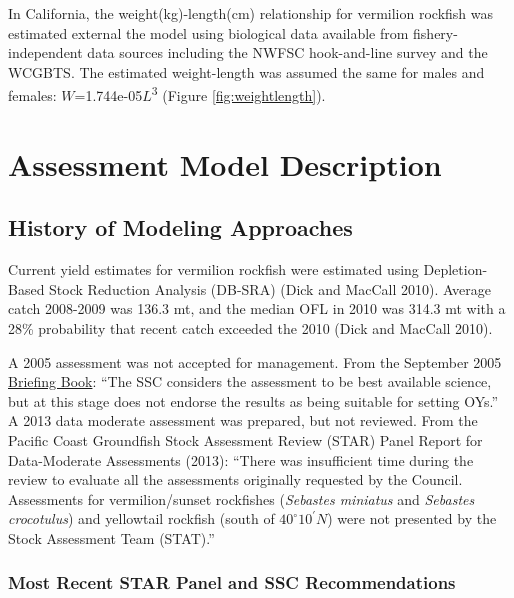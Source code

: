 \documentclass[
  english,
  a4paper,
]{article}
\begin{document}
In California, the weight(kg)-length(cm) relationship for vermilion rockfish was estimated external the
model using biological data available from fishery-independent
data sources including the NWFSC hook-and-line survey and the WCGBTS. The estimated
weight-length was assumed the same for males and females:
\(W\)=1.744e-05\(L\)\textsuperscript{3}
(Figure \ref{fig:weightlength}).

\hypertarget{assessment-model-description}{%
\section{Assessment Model Description}\label{assessment-model-description}}

\hypertarget{history-of-modeling-approaches}{%
\subsection{History of Modeling Approaches}\label{history-of-modeling-approaches}}

Current yield estimates for vermilion rockfish were estimated using
Depletion-Based Stock Reduction Analysis (DB-SRA) (Dick and MacCall 2010). Average catch
2008-2009 was 136.3 mt, and the median OFL in 2010 was 314.3 mt with a 28\%
probability that recent catch exceeded the 2010 (Dick and MacCall 2010).

A 2005 assessment was not accepted for management.
From the September 2005 \href{https://www.pcouncil.org/documents/2005/09/f-groundfish-management-september-2005.pdf/}{Briefing Book}:
``The SSC considers the assessment to be best available science, but at this stage does not
endorse the results as being suitable for setting OYs.'' A 2013 data moderate
assessment was prepared, but not reviewed. From the Pacific Coast Groundfish Stock
Assessment Review (STAR) Panel Report for Data-Moderate Assessments (2013):
``There was insufficient time during the review to evaluate all the assessments
originally requested by the Council. Assessments for vermilion/sunset rockfishes
(\emph{Sebastes miniatus} and \emph{Sebastes crocotulus}) and yellowtail rockfish
(south of $40^\circ 10^\prime N$) were not presented by the Stock Assessment Team (STAT).''

\hypertarget{most-recent-star-panel-and-ssc-recommendations}{%
\subsubsection{Most Recent STAR Panel and SSC Recommendations}\label{most-recent-star-panel-and-ssc-recommendations}}
\end{document}

